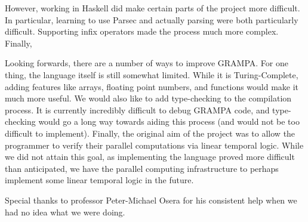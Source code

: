 \documentclass[numbers]{sigplanconf}
\begin{document}
However, working in Haskell did make certain parts of the project more difficult. In particular, learning to use Parsec and actually parsing were both particularly difficult. Supporting infix operators made the process much more complex. Finally, 

Looking forwards, there are a number of ways to improve GRAMPA. For one thing, the language itself is still somewhat limited. While it is Turing-Complete, adding features like arrays, floating point numbers, and functions would make it much more useful. We would also like to add type-checking to the compilation process. It is currently incredibly difficult to debug GRAMPA code, and type-checking would go a long way towards aiding this process (and would not be too difficult to implement). Finally, the original aim of the project was to allow the programmer to verify their parallel computations via linear temporal logic. While we did not attain this goal, as implementing the language proved more difficult than anticipated, we have the parallel computing infrastructure to perhaps implement some linear temporal logic in the future. 

\acks

Special thanks to professor Peter-Michael Osera for his consistent help when we had no idea what we were doing.





\begin{thebibliography}{}
\softraggedright


\end{thebibliography}

\onecolumn
\appendix
\end{document}
